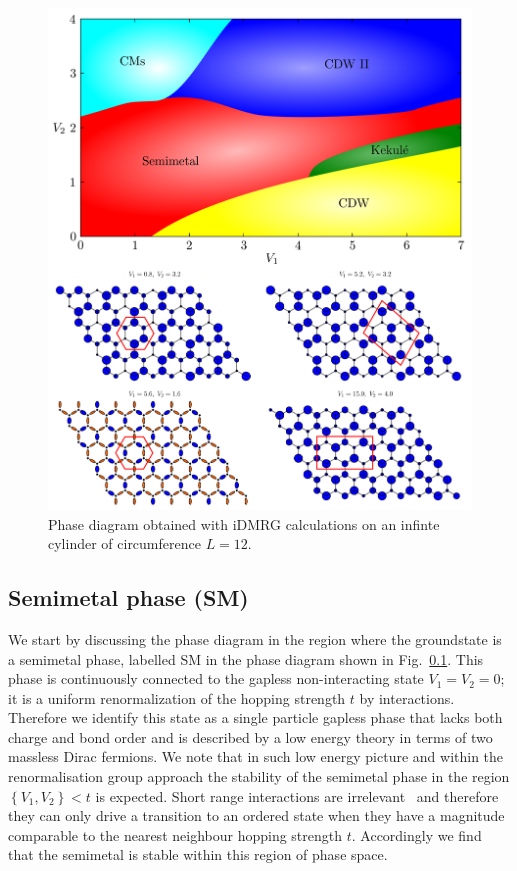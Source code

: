 \documentclass[aps,prx,10pt,twocolumn,floatfix,superscriptaddress,showpacs,numerical,footinbib]{revtex4-1}
\begin{document}
\begin{figure}
 \includegraphics[width=\columnwidth]{pdf/phase_diagram.pdf}
 \caption{Phase diagram obtained with iDMRG calculations on an infinte cylinder of circumference $L=12$. \label{fig:phase diagram}}
\end{figure}

%
\subsection{Semimetal phase (SM)}
%
We start by discussing the phase diagram in the region where 
the groundstate is a semimetal phase, labelled SM in the phase diagram shown in Fig.~\ref{}.
%
This phase is continuously connected to the gapless non-interacting state $V_{1}=V_{2}=0$; 
it is a uniform renormalization of the hopping strength $t$ by interactions.
%
Therefore we identify this state as a single particle gapless phase that lacks both charge and bond order and is described by a low energy theory in terms of two massless Dirac fermions.
%
We note that in such low energy picture and within the renormalisation group approach the stability of the semimetal phase in the region $\left\lbrace V_{1},V_{2}\right\rbrace < t$ is expected.
%
Short range interactions are irrelevant~\cite{Shankar?} and therefore they can only drive a transition to an ordered state when they have a magnitude comparable to the nearest neighbour hopping strength $t$.
%
Accordingly we find that the semimetal is stable within this region of phase space.
\end{document}

